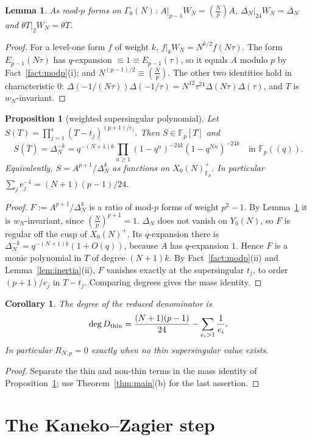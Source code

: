 \documentclass[11pt,a4paper]{article}
\numberwithin{equation}{section}
\newtheorem{proposition}[theorem]{Proposition}
\newtheorem{lemma}[theorem]{Lemma}
\newtheorem{corollary}[theorem]{Corollary}
\theoremstyle{definition}
\theoremstyle{remark}
\newcommand{\Fp}{\mathbb F_p}
\newcommand{\Lp}[1]{\left(\frac{#1}{p}\right)}
\begin{document}
\begin{lemma}\label{lem:AW}
As mod-$p$ forms on $\Gamma_0(N)$: $A|_{p-1}W_N=\Lp{N}A$, $\Delta_N|_{24}W_N=\Delta_N$ and
$\theta T|_2W_N=\theta T$.
\end{lemma}
\begin{proof}
For a level-one form $f$ of weight $k$, $f|_kW_N=N^{k/2}f(N\tau)$. The form $E_{p-1}(N\tau)$ has
$q$-expansion $\equiv1\equiv E_{p-1}(\tau)$, so it equals $A$ modulo $p$ by Fact~\ref{fact:modp}(i);
and $N^{(p-1)/2}\equiv\Lp N$. The other two identities hold in characteristic $0$:
$\Delta(-1/(N\tau))\Delta(-1/\tau)=N^{12}\tau^{24}\Delta(N\tau)\Delta(\tau)$, and $T$ is
$w_N$-invariant.
\end{proof}

\begin{proposition}[weighted supersingular polynomial]\label{prop:S}
Let $S(T)=\prod_{j=1}^s(T-t_j)^{(p+1)/e_j}$. Then $S\in\Fp[T]$ and
\[
S(\overline T)=\Delta_N^{-k}=q^{-(N+1)k}\prod_{n\ge1}(1-q^n)^{-24k}(1-q^{Nn})^{-24k}\quad\text{in }\Fp((q)).
\]
Equivalently, $S=A^{p+1}/\Delta_N^{k}$ as functions on $X_0(N)^+_{\Fp}$. In particular
$\sum_j e_j^{-1}=(N+1)(p-1)/24$.
\end{proposition}
\begin{proof}
$F:=A^{p+1}/\Delta_N^k$ is a ratio of mod-$p$ forms of weight $p^2-1$. By Lemma~\ref{lem:AW} it is
$w_N$-invariant, since $\Lp N^{p+1}=1$. $\Delta_N$ does not vanish on $Y_0(N)$, so $F$ is regular off the cusp of
$X_0(N)^+$. Its $q$-expansion there is $\Delta_N^{-k}=q^{-(N+1)k}(1+O(q))$, because $A$ has
$q$-expansion $1$. Hence $F$ is a monic polynomial in $T$ of degree $(N+1)k$. By
Fact~\ref{fact:modp}(ii) and Lemma~\ref{lem:inertia}(ii), $F$ vanishes exactly at the supersingular
$t_j$, to order $(p+1)/e_j$ in $T-t_j$. Comparing degrees gives the mass identity.
\end{proof}

\begin{corollary}\label{cor:degree}
The degree of the reduced denominator is
\[
\deg D_{\rm thin}=\frac{(N+1)(p-1)}{24}-\sum_{e_i>1}\frac1{e_i}.
\]
In particular $R_{N,p}=0$ exactly when no thin supersingular value exists.
\end{corollary}
\begin{proof}
Separate the thin and non-thin terms in the mass identity of
Proposition~\ref{prop:S}; use Theorem~\ref{thm:main}(b) for the last assertion.
\end{proof}

\section{The Kaneko--Zagier step}\label{sec:kz}
\end{document}
